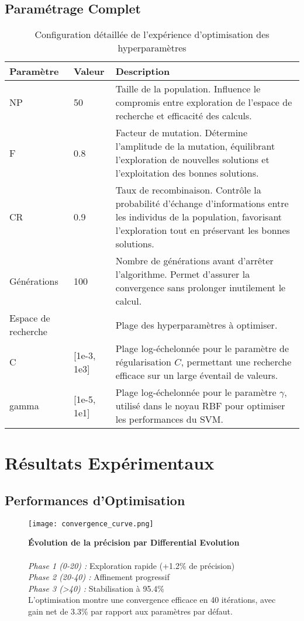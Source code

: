 \documentclass[a4paper, 12pt]{article}
\begin{document}
\subsection{Paramétrage Complet}
\begin{table}[H]
\centering
\begin{tabular}{@{}lll@{}}
\toprule
\textbf{Paramètre} & \textbf{Valeur} & \textbf{Description} \\
\midrule
NP & 50 & Taille de la population. Influence le compromis entre exploration de l’espace de recherche et efficacité des calculs. \\
F & 0.8 & Facteur de mutation. Détermine l’amplitude de la mutation, équilibrant l’exploration de nouvelles solutions et l’exploitation des bonnes solutions. \\
CR & 0.9 & Taux de recombinaison. Contrôle la probabilité d’échange d’informations entre les individus de la population, favorisant l'exploration tout en préservant les bonnes solutions. \\
Générations & 100 & Nombre de générations avant d'arrêter l'algorithme. Permet d'assurer la convergence sans prolonger inutilement le calcul. \\
Espace de recherche & & Plage des hyperparamètres à optimiser. \\
\quad C & [1e-3, 1e3] & Plage log-échelonnée pour le paramètre de régularisation \( C \), permettant une recherche efficace sur un large éventail de valeurs. \\
\quad gamma & [1e-5, 1e1] & Plage log-échelonnée pour le paramètre \( \gamma \), utilisé dans le noyau RBF pour optimiser les performances du SVM. \\
\bottomrule
\end{tabular}
\caption{Configuration détaillée de l'expérience d'optimisation des hyperparamètres}
\end{table}

\section{Résultats Expérimentaux}
\subsection{Performances d'Optimisation}
\begin{figure}[h]
\centering
\texttt{[image: convergence\_curve.png]}
\caption{\textbf{Évolution de la précision par Differential Evolution} \\\\
\textit{Phase 1 (0-20) :} Exploration rapide (+1.2\% de précision) \\
\textit{Phase 2 (20-40) :} Affinement progressif \\
\textit{Phase 3 (>40) :} Stabilisation à 95.4\% \\[2pt]
\footnotesize L'optimisation montre une convergence efficace en 40 itérations, avec gain net de 3.3\% par rapport aux paramètres par défaut.}
\label{fig:convergence}
\end{figure}
\end{document}
